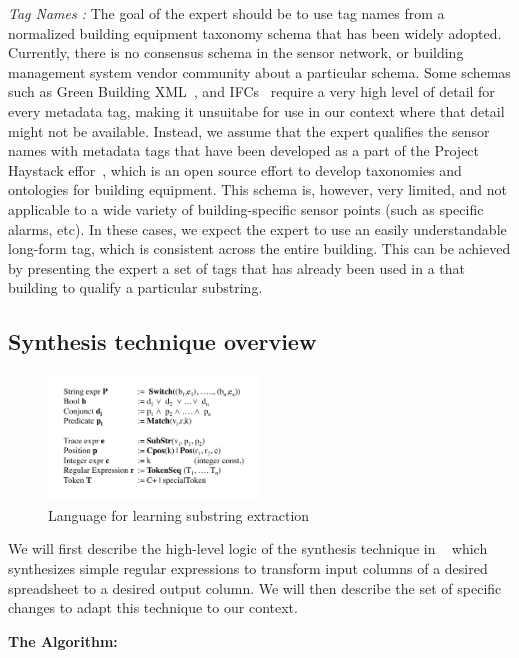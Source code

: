 {\it Tag Names :} The goal of the expert should be to use tag names from a normalized building equipment taxonomy schema that has been widely adopted. Currently, there is no consensus schema in the sensor network, or building management system vendor community about a particular schema. Some schemas such as Green Building XML~\cite{}, and IFCs~\cite{} require a very high level of detail for every metadata tag, making it unsuitabe for use in our context where that detail might not be available. Instead, we assume that the expert qualifies the sensor names with metadata tags that have been developed as a part of the Project Haystack effor~\cite{}, which is an open source effort to develop taxonomies and ontologies for building equipment. This schema is, however, very limited, and not applicable to a wide variety of building-specific sensor points (such as specific alarms, etc). In these cases, we expect the expert to use an easily understandable long-form tag, which is consistent across the entire building. This can be achieved by presenting the expert a set of tags that has already been used in a that building to qualify a particular substring. 


\subsection{Synthesis technique overview}
\label{sec:synth}

\begin{figure}[h!]
  
  \centering
    \includegraphics[width=0.5\textwidth]{figs/stringLanguage.pdf}
\caption{Language for learning substring extraction}
\label{fig:language}
\end{figure}


We will first describe the high-level logic of the synthesis technique in ~\cite{gulwani} which synthesizes simple regular expressions to transform input columns of a desired spreadsheet to a desired output column. We will then describe the set of specific changes to adapt this technique to our context. 

{\bf The Algorithm:}

